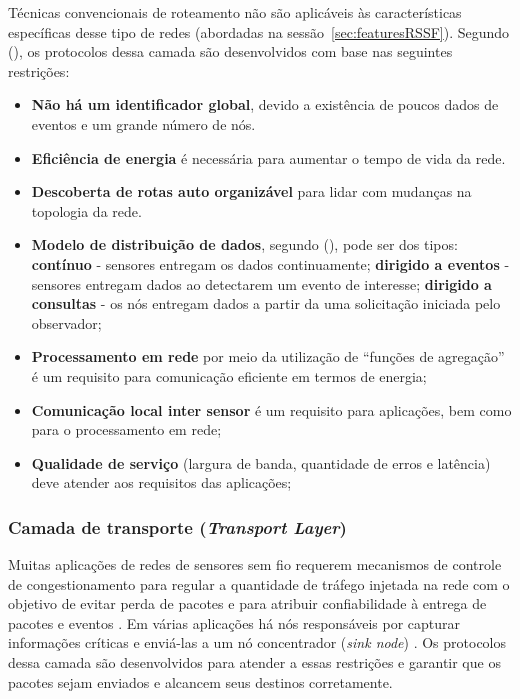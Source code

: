  Técnicas convencionais de roteamento não são aplicáveis às características específicas desse tipo de redes (abordadas na sessão~\ref{sec:featuresRSSF}). Segundo  (\cite{Guerses2005}), os protocolos dessa camada são desenvolvidos com base nas seguintes restrições:
 
 \begin{itemize}
 \item \textbf{Não há um identificador global}, devido a existência de poucos dados de eventos e um grande número de nós.
 \item \textbf{Eficiência de energia} é necessária para aumentar o tempo de vida da rede.
 \item \textbf{Descoberta de rotas auto organizável} para lidar com mudanças na topologia da rede.
 \item \textbf{Modelo de distribuição de dados}, segundo  (\citeyear{Tilak02ataxonomy}), pode ser dos tipos:
 \subitem \textbf{contínuo} - sensores entregam os dados continuamente;
 \subitem \textbf{dirigido a eventos} - sensores entregam dados ao detectarem um evento de interesse;
 \subitem \textbf{dirigido a consultas} - os nós entregam dados a partir da uma solicitação iniciada pelo observador;
 \item \textbf{Processamento em rede} por meio da utilização de ``funções de agregação'' é um requisito para comunicação eficiente em termos de energia;
 \item \textbf{Comunicação local inter sensor} é um requisito para aplicações, bem como para o processamento em rede;
 \item \textbf{Qualidade de serviço} (largura de banda, quantidade de erros e latência) deve atender aos requisitos das aplicações; 
 
 \end{itemize}

 \subsubsection{Camada de transporte (\emph{Transport Layer})} 
 
 Muitas aplicações de redes de sensores sem fio requerem mecanismos de controle de congestionamento para regular a quantidade de tráfego injetada na rede com o objetivo de evitar perda de pacotes e para atribuir confiabilidade à entrega de pacotes e eventos \cite{RaSaGu2008-InCol}. Em várias aplicações há nós responsáveis por capturar informações críticas e enviá-las a um nó concentrador (\textit{sink node}) \cite{RaSaGu2008-InCol}. Os protocolos dessa camada são desenvolvidos para atender a essas restrições e garantir que os pacotes sejam enviados e alcancem seus destinos corretamente.

